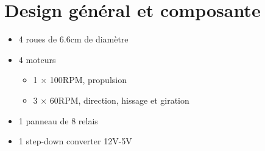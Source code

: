 \documentclass{article}
\begin{document}
\section{Design général et composante}
\begin{itemize}
\item 4 roues de 6.6cm de diamètre
\item 4 moteurs
  \begin{itemize}
  \item 1 $\times$ 100RPM, propulsion
  \item 3 $\times$ 60RPM, direction, hissage et giration
  \end{itemize}
\item 1 panneau de 8 relais
\item 1 step-down converter 12V-5V
\end{itemize}
\end{document}
